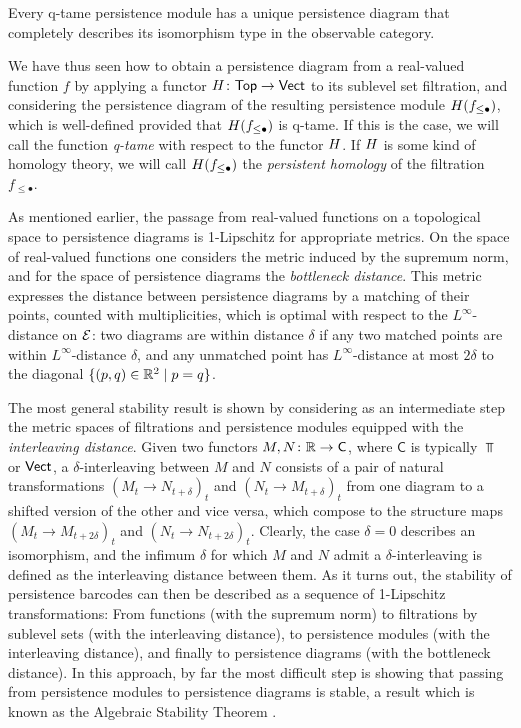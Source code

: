 \begin{thm} \label{t:q-tame modules have barcodes}
	Every q-tame persistence module has a unique persistence diagram that completely describes its isomorphism type in the observable category.
\end{thm}

We have thus seen how to obtain a persistence diagram from a real-valued function $f$ by applying a functor $H \colon \mathsf{Top} \to \mathsf{Vect}$ to its sublevel set filtration, and considering the persistence diagram of the resulting persistence module $H(f_{\leq \bullet})$, which is well-defined provided that $H(f_{\leq \bullet})$ is q-tame.
If this is the case, we will call the function \emph{q-tame} with respect to the functor $H$.
If $H$ is some kind of homology theory, we will call $H(f_{\leq \bullet})$ the \emph{persistent homology} of the filtration $f_{\leq \bullet}$.

As mentioned earlier, the passage from real-valued functions on a topological space to persistence diagrams is 1-Lipschitz for appropriate metrics.
On the space of real-valued functions one considers the metric induced by the supremum norm, and for the space of persistence diagrams the \emph{bottleneck distance}.
This metric expresses the distance between persistence diagrams by a matching of their points, counted with multiplicities, which is optimal with respect to the $L^{\infty}$-distance on $\mathcal{E}$: two diagrams are within distance $\delta$ if any two matched points are within $L^{\infty}$-distance $\delta$, and any unmatched point has $L^{\infty}$-distance at most $2\delta$ to the diagonal $\{(p,q) \in \mathbb{R}^2 \mid p = q\}$.

The most general stability result is shown by considering as an intermediate step the metric spaces of filtrations and persistence modules equipped with the \emph{interleaving distance}.
Given two functors $M,N \colon \mathbb{R} \to \mathsf C$, where $\mathsf C$ is typically $\Top$ or $\mathsf{Vect}$, a $\delta$-interleaving between $M$ and $N$ consists of a pair of natural transformations $(M_t \to N_{t+\delta})_t$ and $(N_t \to M_{t+\delta})_t$ from one diagram to a shifted version of the other and vice versa, which compose to the structure maps $(M_t \to M_{t+2\delta})_t$ and $(N_t \to N_{t+2\delta})_t$.
Clearly, the case $\delta=0$ describes an isomorphism, and the infimum $\delta$ for which $M$ and $N$ admit a $\delta$-interleaving is defined as the interleaving distance between them.
As it turns out, the stability of persistence barcodes can then be described as a sequence of 1-Lipschitz transformations: From functions (with the supremum norm) to filtrations by sublevel sets (with the interleaving distance), to persistence modules (with the interleaving distance), and finally to persistence diagrams (with the bottleneck distance).
In this approach, by far the most difficult step is showing that passing from persistence modules to persistence diagrams is stable, a result which is known as the Algebraic Stability Theorem \cite{Chazal.2009, Chazal.2016a, Bauer.2015, Cohen-Steiner.2007}.
